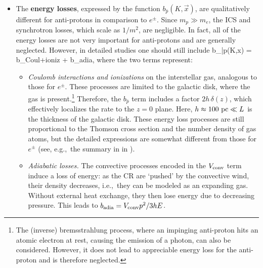\begin{itemize}
\item[$\triangleright$] The {\bf energy losses}, expressed by the function $b_{\bar p} (K,\vec x)$, are qualitatively different for anti-protons  in comparison to $e^\pm$. Since $m_p \gg m_e$, the ICS and synchrotron losses, which scale as $1/m^2$, are negligible. 
In fact, all of the energy losses are
not very important for anti-protons and are generally neglected. However, in detailed studies one should still include \cite{Pbarenergylosses}
\beq
b_{\bar p}(K,\vec x) = b_{\rm Coul+ioniz} + b_{\rm adia},
\eeq
where the two terms represent:
\begin{itemize}
\item {\em Coulomb interactions and ionizations} on the interstellar gas, analogous to those for $e^\pm$. These processes are limited to the galactic disk, where the gas is present.\footnote{The (inverse) bremsstrahlung process, where an impinging anti-proton hits an atomic electron at rest, causing the emission of a photon, can also be considered. However, it does not lead to appreciable energy loss for the anti-proton and is therefore neglected.} Therefore, the $b_{\bar p}$ term includes a factor $2 h \, \delta(z)$, which effectively localizes the rate to the $z = 0$ plane. Here, $h \approx 100 \ {\rm pc} \ll L$ is the thickness of the galactic disk. These energy loss processes are still proportional to the Thomson cross section and the number density of gas atoms, but the detailed expressions are somewhat different from those for $e^\pm$ (see, e.g.,~the summary in  in \cite{Pbarenergylosses}). 
\item {\em Adiabatic losses.} The convective processes encoded in the $V_{\rm conv}$ term induce a loss of energy: 
as the CR are `pushed' by the convective wind, their density decreases, i.e.,~they can be modeled as an expanding gas. 
Without external heat exchange, they then lose energy due to decreasing pressure.
This leads to $b_{\rm adia} = V_{\rm conv} p^2/3h E$. 
\end{itemize}


\end{itemize}
